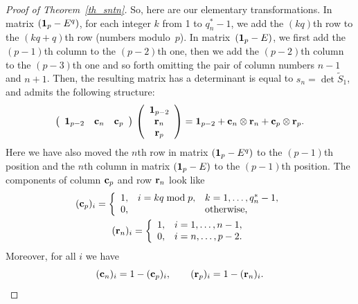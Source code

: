 \documentclass[pdftex]{sigma}
\begin{document}
\begin{proof}[Proof of Theorem~\ref{th_sntn}]
So, here are our elementary transformations. In matrix $({\bf 1}_p - E^q)$, for each integer $k$ from 1 to $q^*_n - 1$, we add the $(kq)$th row
to the $(kq+q)$th row (numbers modulo~$p$).
In matrix~$({\bf 1}_p - E)$, we f\/irst add the $(p-1)$th column to the $(p-2)$th one, then we add the $(p-2)$th column to the $(p-3)$th one and so forth omitting the pair of column numbers $n-1$ and $n+1$. Then, the resulting matrix has a determinant is equal to $s_n = \det \widetilde S_1$, and admits the following structure:
\begin{equation}
\left(\begin{array}{ccc} {\bf 1}_{p - 2} & {\bf c}_n & {\bf c}_p\end{array}\right) \, \left(\begin{array}{c}{\bf 1}_{p - 2} \\ {\bf r}_n \\ {\bf r}_p \end{array}\right) = {\bf 1}_{p - 2} + {\bf c}_n \otimes
{\bf r}_n + {\bf c}_p \otimes {\bf r}_p.
\label{eq_tildeS1}
\end{equation}
Here we have also moved the $n$th row in matrix $({\bf 1}_p - E^q)$ to the $(p-1)$th position and the $n$th column in matrix $({\bf 1}_p - E)$ to the $(p-1)$th position. The components of column ${\bf c}_p$ and row ${\bf r}_n$ look like
\begin{gather*}
({\bf c}_p)_i = \left\{
\begin{array}{ccc}
1, & i = kq \bmod p, & k = 1, \ldots, q^*_n - 1, \\
0, && {\rm otherwise},\hfill \\
\end{array}
\right.
\\
({\bf r}_n)_i = \left\{
\begin{array}{cc}
1, & i = 1, \ldots, n - 1, \\
0, & i = n, \ldots, p - 2. \\
\end{array}
\right.
\end{gather*}
Moreover, for all $i$ we have
\begin{equation}
({\bf c}_n)_i = 1 - ({\bf c}_p)_i, \qquad ({\bf r}_p)_i = 1 - ({\bf r}_n)_i. \label{eq_2sums}
\end{equation}


\end{proof}
\end{document}
